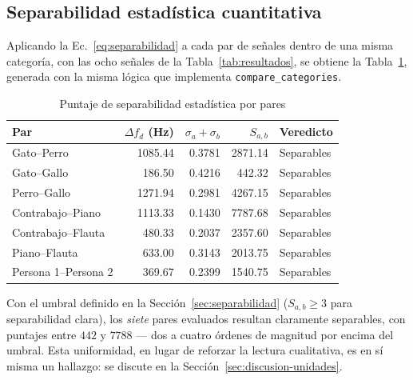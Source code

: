 \subsection{Separabilidad estadística cuantitativa}
\label{sec:resultados-separabilidad}

Aplicando la Ec.~\ref{eq:separabilidad} a cada par de señales dentro de una misma categoría, con las ocho señales de la Tabla~\ref{tab:resultados}, se obtiene la Tabla~\ref{tab:separabilidad}, generada con la misma lógica que implementa \texttt{compare\_categories}.

\begin{table}[!t]
\centering
\caption{Puntaje de separabilidad estadística por pares}
\label{tab:separabilidad}
\small
\begin{tabular}{@{}l r r r l@{}}
\toprule
Par & $\Delta f_d$ (Hz) & $\sigma_a+\sigma_b$ & $S_{a,b}$ & Veredicto \\
\midrule

Gato--Perro & 1085.44 & 0.3781 & 2871.14 & Separables \\
Gato--Gallo & 186.50 & 0.4216 & 442.32 & Separables \\
Perro--Gallo & 1271.94 & 0.2981 & 4267.15 & Separables \\

\midrule

Contrabajo--Piano & 1113.33 & 0.1430 & 7787.68 & Separables \\
Contrabajo--Flauta & 480.33 & 0.2037 & 2357.60 & Separables \\
Piano--Flauta & 633.00 & 0.3143 & 2013.75 & Separables \\

\midrule

Persona 1--Persona 2 & 369.67 & 0.2399 & 1540.75 & Separables \\

\bottomrule
\end{tabular}
\end{table}

Con el umbral definido en la Sección~\ref{sec:separabilidad} ($S_{a,b} \geq 3$ para separabilidad clara), los \emph{siete} pares evaluados resultan claramente separables, con puntajes entre $442$ y $7788$ — dos a cuatro órdenes de magnitud por encima del umbral. Esta uniformidad, en lugar de reforzar la lectura cualitativa, es en sí misma un hallazgo: se discute en la Sección~\ref{sec:discusion-unidades}.

